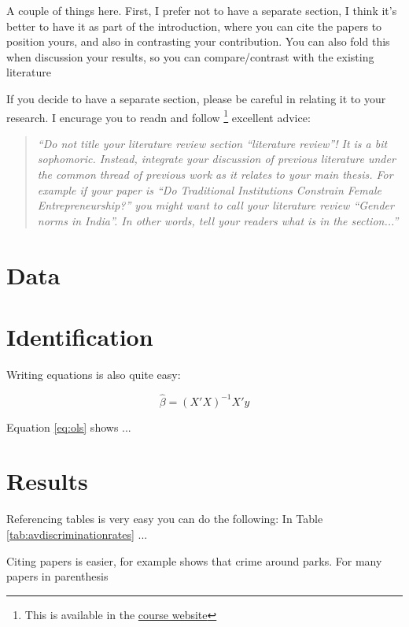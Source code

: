 \documentclass[12pt,a4paper,onecolumn]{article}
\begin{document}
A couple of things here. First, I prefer not to have a separate section, I think it's better to have it as part of the introduction, where you can cite the papers to position yours, and also in contrasting your contribution. You can also fold this when discussion your results, so you can compare/contrast with the existing literature


If you decide to have a separate section, please be careful in relating it to your research. I encurage you to readn and follow \cite{nikolov2020writing}\footnote{This is available in the \href{https://ignaciomsarmiento.github.io/teaching/Tesis.html}{course website}} excellent advice:

\begin{quote}
    {\it ``Do not title your literature review section ``literature review''! It is a bit sophomoric. Instead, integrate your discussion of previous literature under the common thread of previous work as it relates to your main thesis.  For example if your paper is ``Do Traditional Institutions Constrain Female Entrepreneurship?'' you might want to call your literature review ``Gender norms in India''. In other words, tell your readers what is in the section...''} \citep{nikolov2020writing}
\end{quote}



\section{Data}

\section{Identification}

Writing equations is also quite easy: 

\begin{equation}
\label{eq:ols}
    \hat{\beta}= (X'X)^{-1}X'y
\end{equation}

Equation \eqref{eq:ols} shows ...

\section{Results}

Referencing tables is very easy you can do the following: In Table \ref{tab:avdiscriminationrates} ...

Citing papers is easier, for example \cite{albouy2020unlocking} shows that crime around parks. For many papers in parenthesis \cite{albouy2020unlocking,mcmillen2019more} 
\end{document}
